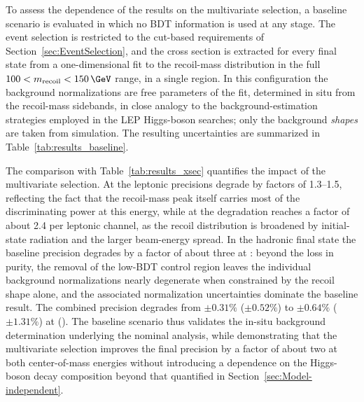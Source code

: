 %

To assess the dependence of the results on the multivariate selection, a
baseline scenario is evaluated in which no BDT information is used at any
stage. The event selection is restricted to the cut-based requirements of
Section~\ref{sec:EventSelection}, and the cross section is extracted for every
final state from a one-dimensional fit to the recoil-mass distribution in
the full $100 < m_{\text{recoil}} < 150\,\GeV$ range, in a single region. In this
configuration the background normalizations are free parameters of the
fit, determined in situ from the recoil-mass sidebands, in close analogy
to the background-estimation strategies employed in the LEP
Higgs-boson searches; only the background \emph{shapes} are taken from
simulation. The resulting uncertainties are summarized in
Table~\ref{tab:results_baseline}.

The comparison with Table~\ref{tab:results_xsec} quantifies the impact of
the multivariate selection. At \sqrtsZH the leptonic precisions degrade by
factors of 1.3--1.5, reflecting the fact that the recoil-mass peak itself
carries most of the discriminating power at this energy, while at
\sqrtsTop the degradation reaches a factor of about 2.4 per leptonic
channel, as the recoil distribution is broadened by initial-state
radiation and the larger beam-energy spread. In the hadronic final state
the baseline precision degrades by a factor of about three at \sqrtsZH:
beyond the loss in purity, the removal of the low-BDT control region
leaves the individual background normalizations nearly degenerate when
constrained by the recoil shape alone, and the associated normalization
uncertainties dominate the baseline result. The combined precision
degrades from $\pm 0.31\%$ ($\pm 0.52\%$) to $\pm 0.64\%$ ($\pm 1.31\%$)
at \sqrtsZH (\sqrtsTop). The baseline scenario thus validates the
in-situ background determination underlying the nominal analysis, while
demonstrating that the multivariate selection improves the final
precision by a factor of about two at both center-of-mass energies
without introducing a dependence on the Higgs-boson decay composition
beyond that quantified in Section~\ref{sec:Model-independent}.

